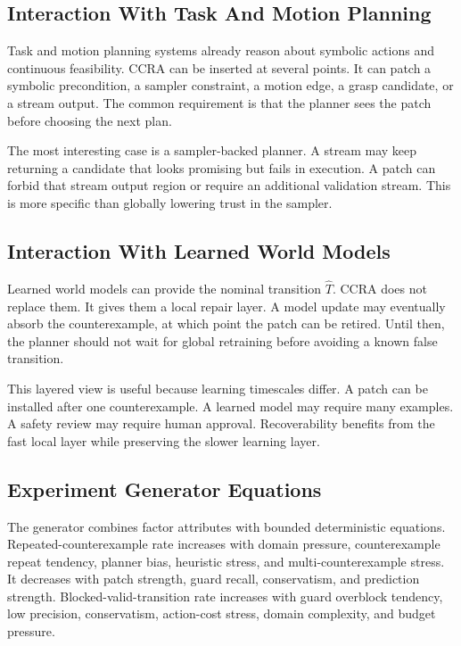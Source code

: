 \documentclass{article}
\newcommand{\ccra}{\textsc{CCRA}}
\newcommand{\model}{\hat{T}}
\begin{document}
\subsection{Interaction With Task And Motion Planning}

Task and motion planning systems already reason about symbolic actions and
continuous feasibility. \ccra{} can be inserted at several points. It can patch
a symbolic precondition, a sampler constraint, a motion edge, a grasp candidate,
or a stream output. The common requirement is that the planner sees the patch
before choosing the next plan.

The most interesting case is a sampler-backed planner. A stream may keep
returning a candidate that looks promising but fails in execution. A patch can
forbid that stream output region or require an additional validation stream.
This is more specific than globally lowering trust in the sampler.

\subsection{Interaction With Learned World Models}

Learned world models can provide the nominal transition $\model$. \ccra{} does
not replace them. It gives them a local repair layer. A model update may
eventually absorb the counterexample, at which point the patch can be retired.
Until then, the planner should not wait for global retraining before avoiding a
known false transition.

This layered view is useful because learning timescales differ. A patch can be
installed after one counterexample. A learned model may require many examples.
A safety review may require human approval. Recoverability benefits from the
fast local layer while preserving the slower learning layer.

\subsection{Experiment Generator Equations}

The generator combines factor attributes with bounded deterministic equations.
Repeated-counterexample rate increases with domain pressure, counterexample
repeat tendency, planner bias, heuristic stress, and multi-counterexample
stress. It decreases with patch strength, guard recall, conservatism, and
prediction strength. Blocked-valid-transition rate increases with guard
overblock tendency, low precision, conservatism, action-cost stress, domain
complexity, and budget pressure.
\end{document}
